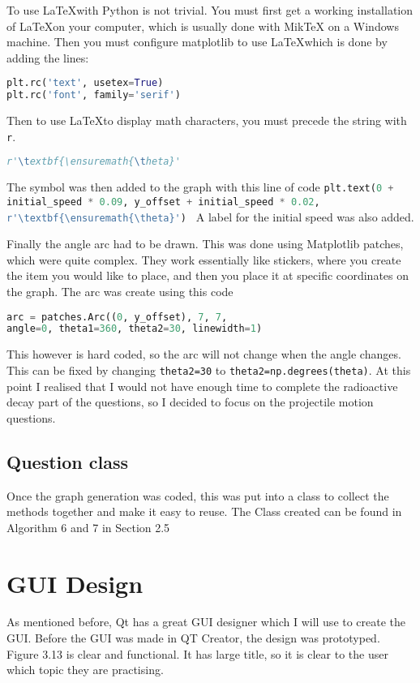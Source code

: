 To use \LaTeX with Python is not trivial. You must first get a working installation of \LaTeX on your computer, which is usually done with MikTeX on a Windows machine. Then you must configure matplotlib to use \LaTeX which is done by adding the lines:
\begin{lstlisting}[language=Python, caption=Requirements for \LaTeX in matplotlib]
plt.rc('text', usetex=True) 
plt.rc('font', family='serif') 
\end{lstlisting}
Then to use \LaTeX to display math characters, you must precede the string with \texttt{r}. 
\begin{lstlisting}[language=Python, caption=String used to display $\theta$ using \LaTeX]
r'\textbf{\ensuremath{\theta}'
\end{lstlisting}
The symbol was then added to the graph with this line of code 
\lstinline[language=Python]|plt.text(0 + initial_speed * 0.09, y_offset + initial_speed * 0.02, r'\textbf{\ensuremath{\theta}') |
A label for the initial speed was also added.

Finally the angle arc had to be drawn. This was done using Matplotlib patches, which were quite complex. They work essentially like stickers, where you create the item you would like to place, and then you place it at specific coordinates on the graph. The arc was create using this code
\begin{lstlisting}[language=Python, caption=Requirements for \LaTeX in matplotlib]
arc = patches.Arc((0, y_offset), 7, 7,
angle=0, theta1=360, theta2=30, linewidth=1)
\end{lstlisting}
This however is hard coded, so the arc will not change when the angle changes. This can be fixed by changing \lstinline|theta2=30| to \lstinline|theta2=np.degrees(theta)|.
At this point I realised that I would not have enough time to complete the radioactive decay part of the questions, so I decided to focus on the projectile motion questions.

\subsection{Question class}
Once the graph generation was coded, this was put into a class to collect the methods together and make it easy to reuse. The Class created can be found in Algorithm 6 and 7 in Section 2.5
\section{GUI Design}
As mentioned before, Qt has a great GUI designer which I will use to create the GUI. Before the GUI was made in QT Creator, the design was prototyped.
Figure 3.13 is clear and functional. It has large title, so it is clear to the user which topic they are practising. 


